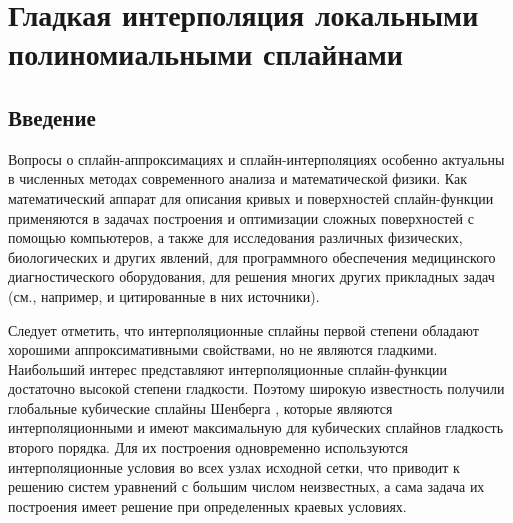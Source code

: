 \section{Гладкая интерполяция локальными полиномиальными сплайнами}
%
%
%
%
%
%

\subsection{Введение}

Вопросы о сплайн-аппроксимациях и сплайн-интерполяциях особенно актуальны
в численных методах современного анализа и математической физики.
Как математический аппарат для описания кривых и поверхностей сплайн-функции
применяются в задачах построения и оптимизации сложных поверхностей с помощью
компьютеров, а также для исследования различных физических, биологических и
других явлений,  для программного обеспечения медицинского диагностического
оборудования, для решения многих других прикладных задач
(см., например,\cite{ark-4,ark-5,ark-6,ark-7} и цитированные в них источники).

Следует отметить, что интерполяционные сплайны первой степени обладают
хорошими аппроксимативными свойствами, но не являются гладкими. Наибольший
интерес представляют интерполяционные сплайн-функции достаточно высокой
степени гладкости. Поэтому широкую известность получили глобальные
кубические сплайны Шенберга \cite{ark-4}, которые являются интерполяционными и
имеют максимальную для кубических сплайнов гладкость второго порядка.
Для их построения одновременно используются интерполяционные условия
во всех узлах исходной сетки, что приводит к решению систем уравнений
с большим числом неизвестных, а сама задача их построения имеет решение
при определенных краевых условиях.

